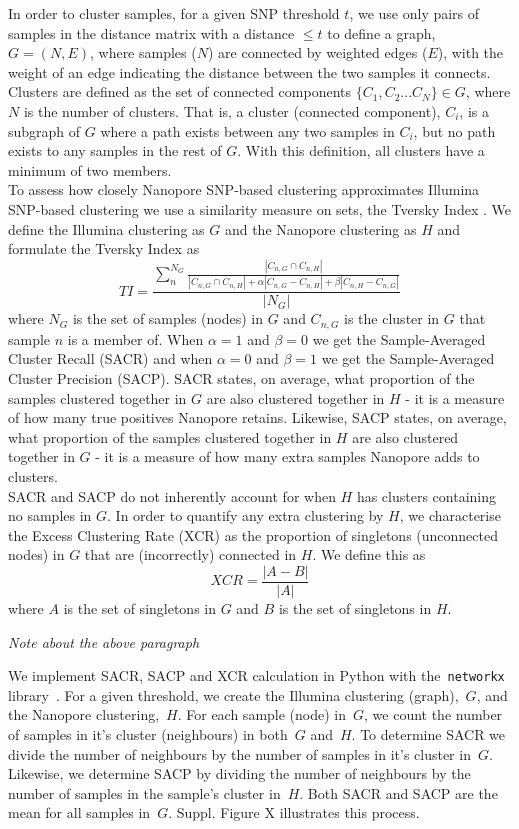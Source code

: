 In order to cluster samples, for a given SNP threshold $t$, we use only pairs of samples in the distance matrix with a distance $\le t$ to define a graph, $G=(N,E)$, where samples ($N$) are connected by weighted edges ($E$), with the weight of an edge indicating the distance between the two samples it connects. Clusters are defined as the set of connected components $\{C_1, C_2...C_N\}\in G$, where $N$ is the number of clusters. That is, a cluster (connected component), $C_i$, is a subgraph of $G$ where a path exists between any two samples in $C_i$, but no path exists to any samples in the rest of $G$. With this definition, all clusters have a minimum of two members. \\
To assess how closely Nanopore SNP-based clustering approximates Illumina SNP-based clustering we use a similarity measure on sets, the Tversky Index . We define the Illumina clustering as $G$ and the Nanopore clustering as $H$ and formulate the Tversky Index as $$TI=\frac{\sum_{n}^{N_G}\frac{\left|C_{n,G}\cap C_{n,H}\right|}{\left|C_{n,G}\cap C_{n,H}\right|+\alpha |C_{n,G}-C_{n,H}|+\beta |C_{n,H}-C_{n,G}|}}{|N_G|}$$
where $N_G$ is the set of samples (nodes) in $G$ and $C_{n,G}$ is the cluster in $G$ that sample $n$ is a member of. When $\alpha = 1$ and $\beta=0$ we get the Sample-Averaged Cluster Recall (SACR) and when $\alpha = 0$ and $\beta = 1$ we get the Sample-Averaged Cluster Precision (SACP). SACR states, on average, what proportion of the samples clustered together in $G$ are also clustered together in $H$ - it is a measure of how many true positives Nanopore retains. Likewise, SACP states, on average, what proportion of the samples clustered together in $H$ are also clustered together in $G$ - it is a measure of how many extra samples Nanopore adds to clusters. \\
SACR and SACP do not inherently account for when $H$ has clusters containing no samples in $G$. In order to quantify any extra clustering by $H$, we characterise the Excess Clustering Rate (XCR) as the proportion of singletons (unconnected nodes) in $G$ that are (incorrectly) connected in $H$. We define this as
$$XCR = \frac{|A-B|}{|A|}$$
where $A$ is the set of singletons in $G$ and $B$ is the set of singletons in $H$.



\emph{{Note about the above paragraph}}

We implement SACR, SACP and XCR calculation in Python with
the~\texttt{networkx} library~. For a given threshold,
we create the Illumina clustering (graph),~\(G\), and the
Nanopore clustering,~\(H\). For each sample (node)
in~\(G\), we count the number of samples in it's cluster
(neighbours) in both~\(G\) and~\(H\). To
determine SACR we divide the number of neighbours by the number of
samples in it's cluster in~\(G\). Likewise, we determine
SACP by dividing the number of neighbours by the number of samples in
the sample's cluster in~\(H\). Both SACR and SACP are the
mean for all samples in~\(G\). Suppl. Figure X illustrates
this process.

